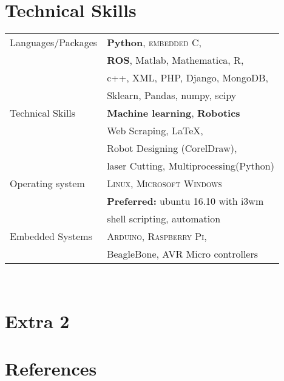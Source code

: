 \documentclass[11pt,a4paper,sans]{moderncv}        %
\begin{document}
\section{Technical Skills}
\begin{tabular}{ll}

Languages/Packages\hspace{1cm}
& \textbf{Python}, \textsc{embedded C},\\
& \textbf{ROS}, Matlab, Mathematica, R, \\
& c++, XML, PHP, Django, MongoDB, \\
& Sklearn, Pandas, numpy, scipy \\
 

Technical Skills\hspace{1cm}
& \textbf{Machine learning}, \textbf{Robotics} \\
& Web Scraping, \LaTeX, \\
& Robot Designing (CorelDraw), \\
& laser Cutting, Multiprocessing(Python) \\

Operating system\hspace{1cm}
& \textsc{Linux}, \textsc{Microsoft Windows} \\
& \textbf{Preferred:} ubuntu 16.10 with i3wm \\
& shell scripting, automation \\

Embedded Systems\hspace{1cm}
& \textsc{Arduino}, \textsc{Raspberry Pi}, \\
& BeagleBone, AVR Micro controllers\\
\end{tabular}\\[8pt]

\section{Extra 2}

\section{References}
\begin{cvcolumns}
\end{cvcolumns}
\end{document}
